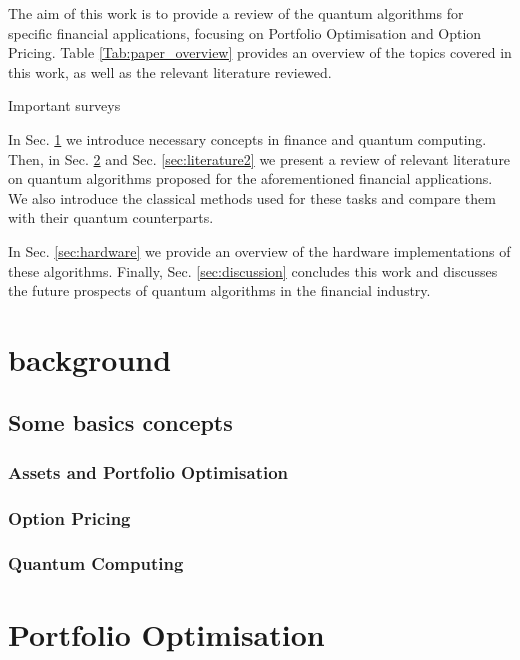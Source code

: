 \documentclass[prx,twocolumn,floatfix,superscriptaddress,longbibliography]{revtex4-1}
\begin{document}
The aim of this work is to provide a review of the quantum algorithms for specific financial applications, focusing on Portfolio Optimisation and Option Pricing. Table \ref{Tab:paper_overview} provides an overview of the topics covered in this work, as well as the relevant literature reviewed. 

Important surveys 

In Sec. \ref{sec:background} we introduce necessary concepts in finance and quantum computing. Then, in Sec. \ref{sec:literature1} and Sec. \ref{sec:literature2}  we present a review of relevant literature on quantum algorithms proposed for the aforementioned financial applications. We also 
  introduce the classical methods used for these tasks and compare them with their quantum counterparts.

In Sec. \ref{sec:hardware} we provide an overview of the hardware implementations of these algorithms. Finally, Sec. \ref{sec:discussion} concludes this work and discusses the future prospects of quantum algorithms in the financial industry.




\section{background}\label{sec:background}



\subsection{Some basics concepts}

\subsubsection{Assets and Portfolio Optimisation}

\subsubsection{Option Pricing}

\subsubsection{Quantum Computing}


\section{Portfolio Optimisation}\label{sec:literature1}
\end{document}
